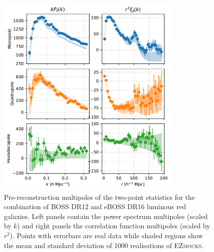 \begin{figure}
    \centering
    \includegraphics[width=0.8\textwidth]{fig/galaxies/DR16LRG_data_ezmock_prerecon.pdf}
    \caption{Pre-reconstruction multipoles of the two-point statistics for the combination of BOSS DR12 and 
    eBOSS DR16 luminous red galaxies. Left panels contain the power spectrum multipoles (scaled by $k$) 
    and right panels the correlation function multipoles (scaled by $r^2$). 
    Points with errorbars are real data while shaded regions show the mean and standard deviation 
    of 1000 realisations of \textsc{EZmocks}. 
    }
    \label{fig:LRG_data_ezmock_correlations_prerec}
\end{figure}

